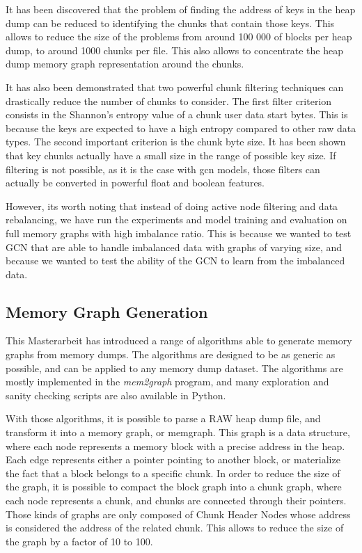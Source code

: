 It has been discovered that the problem of finding the address of keys in the heap dump can be reduced to identifying the chunks that contain those keys. This allows to reduce the size of the problems from around 100 000 of blocks per heap dump, to around 1000 chunks per file. This also allows to concentrate the heap dump memory graph representation around the chunks.

It has also been demonstrated that two powerful chunk filtering techniques can drastically reduce the number of chunks to consider. The first filter criterion consists in the Shannon's entropy value of a chunk user data start bytes. This is because the keys are expected to have a high entropy compared to other raw data types. The second important criterion is the chunk byte size. It has been shown that key chunks actually have a small size in the range of possible key size. If filtering is not possible, as it is the case with \acrshort{gcn} models, those filters can actually be converted in powerful float and boolean features.

However, its worth noting that instead of doing active node filtering and data rebalancing, we have run the experiments and model training and evaluation on full memory graphs with high imbalance ratio. This is because we wanted to test GCN that are able to handle imbalanced data with graphs of varying size, and because we wanted to test the ability of the GCN to learn from the imbalanced data. 

\subsection{Memory Graph Generation}
This Masterarbeit has introduced a range of algorithms able to generate memory graphs from memory dumps. The algorithms are designed to be as generic as possible, and can be applied to any memory dump dataset. The algorithms are mostly implemented in the \textit{mem2graph} program, and many exploration and sanity checking scripts are also available in Python.

With those algorithms, it is possible to parse a RAW heap dump file, and transform it into a memory graph, or memgraph. This graph is a data structure, where each node represents a memory block with a precise address in the heap. Each edge represents either a pointer pointing to another block, or materialize the fact that a block belongs to a specific chunk. In order to reduce the size of the graph, it is possible to compact the block graph into a chunk graph, where each node represents a chunk, and chunks are connected through their pointers. Those kinds of graphs are only composed of Chunk Header Nodes whose address is considered the address of the related chunk. This allows to reduce the size of the graph by a factor of 10 to 100.

